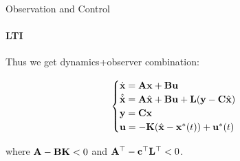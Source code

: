 \documentclass{beamer}
\begin{document}
\begin{frame}{Observation and Control}
\framesubtitle{LTI}
\begin{flushleft}

Thus we get dynamics+observer combination:

\begin{equation}
\begin{cases}
\dot {\mathbf{x}} = \mathbf{A} \mathbf{x} + \mathbf{B} \mathbf{u} \\
\hat{\dot {\mathbf{x}}} = \mathbf{A} \hat{\mathbf{x}} + \mathbf{B} \mathbf u + \mathbf{L}(\mathbf y - \mathbf{C} \hat{\mathbf{x}})\\
\mathbf{y} = \mathbf{C} \mathbf{x} \\
\mathbf{u} = -\mathbf{K} (\hat{\mathbf{x}} - \mathbf{x}^*(t)) + \mathbf{u}^*(t)
\end{cases}
\end{equation}

\bigskip

where $\mathbf{A} - \mathbf{B} \mathbf{K} < 0$ and $\mathbf{A}^{\top} - 
\mathbf{c}^{\top} \mathbf{L}^{\top} < 0$.


\end{flushleft}
\end{frame}
\end{document}
